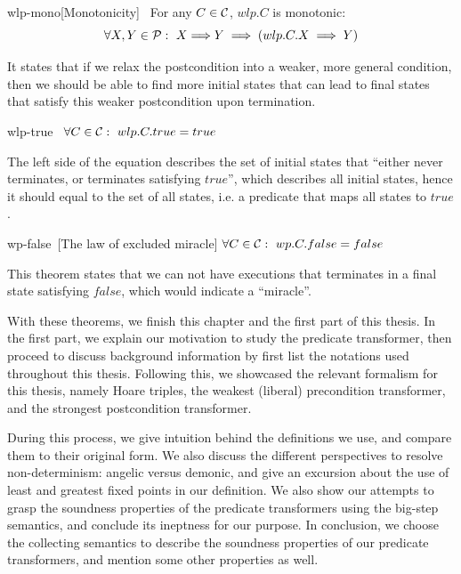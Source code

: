 \begin{theorem}{wlp-mono}[Monotonicity]~{\normalfont\cite{dijkstra90}} For any $C\in\mathcal{C}$, $wlp.C$ is monotonic:
  \[\forall X, Y \in\P:\ X{\implies} Y \implies (wlp.C.X\implies Y)\]
\end{theorem}
It states that if we relax the postcondition into a weaker, more general condition, then we should be able to find more initial states that can lead to final states that satisfy this weaker postcondition upon termination. 

\begin{theorem}{wlp-true}~{\normalfont\cite{dijkstra90}}
  $\forall C\in\mathcal{C}:\ wlp.C.true = true$
\end{theorem}
The left side of the equation describes the set of initial states that ``either never terminates, or terminates satisfying $true$'', which describes all initial states, hence it should equal to the set of all states, i.e. a predicate that maps all states to $true$.

\begin{theorem}{wp-false}~{\normalfont\cite{dijkstra90}}[The law of excluded miracle]
  $\forall C\in\mathcal{C}:\ wp.C.false = false$
\end{theorem}
This theorem states that we can not have executions that terminates in a final state satisfying $false$, which would indicate a ``miracle''. 

\medskip
With these theorems, we finish this chapter and the first part of this thesis. 
In the first part, we explain our motivation to study the predicate transformer, then proceed to discuss background information by first list the notations used throughout this thesis. 
Following this, we showcased the relevant formalism for this thesis, namely Hoare triples, the weakest (liberal) precondition transformer, and the strongest postcondition transformer. 

During this process, we give intuition behind the definitions we use, and compare them to their original form. 
We also discuss the different perspectives to resolve non-determinism: angelic versus demonic, and give an excursion about the use of least and greatest fixed points in our definition. 
We also show our attempts to grasp the soundness properties of the predicate transformers using the big-step semantics, and conclude its ineptness for our purpose. 
In conclusion, we choose the collecting semantics to describe the soundness properties of our predicate transformers, and mention some other properties as well. 

